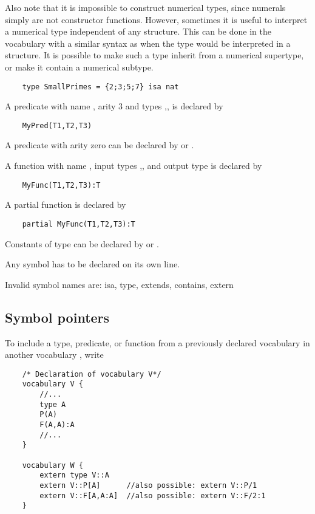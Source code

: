 Also note that it is impossible to construct numerical types, since numerals simply are not constructor functions. However, sometimes it is useful to interpret a numerical type independent of any structure. This can be done in the vocabulary with a similar syntax as when the type would be interpreted in a structure. It is possible to make such a type inherit from a numerical supertype, or make it contain a numerical subtype.
\begin{lstlisting}
	type SmallPrimes = {2;3;5;7} isa nat 
\end{lstlisting}

A predicate with name , arity 3 and types ,, is declared by
\begin{lstlisting}
	MyPred(T1,T2,T3) 
\end{lstlisting}

A predicate with arity zero can be declared by  or .

A function with name , input types ,, and output type   is declared by
\begin{lstlisting}
	MyFunc(T1,T2,T3):T
\end{lstlisting}

A partial function is declared by 
\begin{lstlisting}
	partial MyFunc(T1,T2,T3):T
\end{lstlisting}

Constants of type  can be declared by  or .

Any symbol has to be declared on its own line.

Invalid symbol names are: isa, type, extends, contains, extern



\subsection{Symbol pointers}

To include a type, predicate, or function from a previously declared vocabulary  in another vocabulary , write
\begin{lstlisting}
	/* Declaration of vocabulary V*/
	vocabulary V {
		//...
		type A
		P(A)
		F(A,A):A
		//...
	}

	vocabulary W {
		extern type V::A
		extern V::P[A]		//also possible: extern V::P/1
		extern V::F[A,A:A]	//also possible: extern V::F/2:1
	}
\end{lstlisting}

